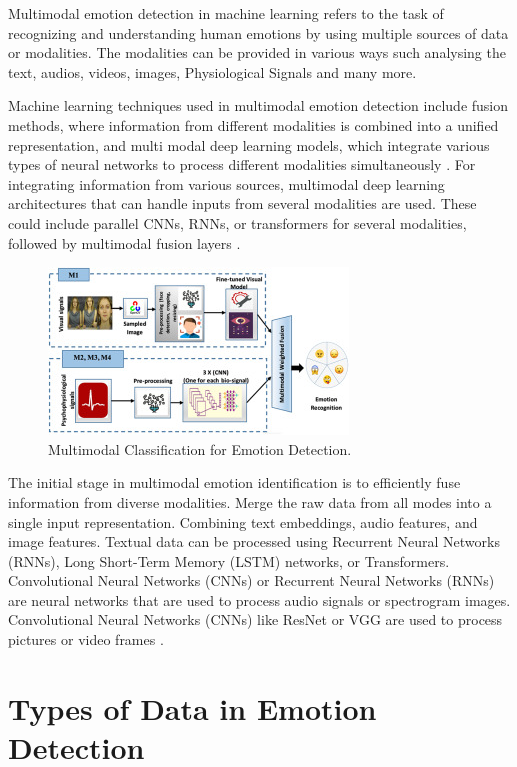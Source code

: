 \documentclass[conference]{IEEEtran}
\begin{document}
Multimodal emotion detection in machine learning refers to the task of recognizing and understanding human emotions by using multiple sources of data or modalities. \cite{hina2022multimodal}
The modalities can  be provided in various ways such analysing the text, audios, videos, images, Physiological Signals and many more.

Machine learning techniques used in multimodal emotion detection include fusion methods, where information from different modalities is combined into a unified representation, and multi modal deep learning models, which integrate various types of neural networks to process different modalities simultaneously \cite{joshi2022cogmen}. For integrating information from various sources, multimodal deep learning architectures that can handle inputs from several modalities are used. These could include parallel CNNs, RNNs, or transformers for several modalities, followed by multimodal fusion layers \cite{sharafi2022novel}. 

\begin{figure}[htbp]
\centerline{\includegraphics{Multimodal.png}}
\caption{Multimodal Classification for Emotion Detection.\cite{KUMAR2022104483}}
\label{fig}
\end{figure}

The initial stage in multimodal emotion identification is to efficiently fuse information from diverse modalities. Merge the raw data from all modes into a single input representation. Combining text embeddings, audio features, and image features. Textual data can be processed using Recurrent Neural Networks (RNNs), Long Short-Term Memory (LSTM) networks, or Transformers. Convolutional Neural Networks (CNNs) or Recurrent Neural Networks (RNNs) are neural networks that are used to process audio signals or spectrogram images. Convolutional Neural Networks (CNNs) like ResNet or VGG are used to process pictures or video frames \cite{huang2019multimodal}.

\section{Types of Data in Emotion Detection}
\end{document}
